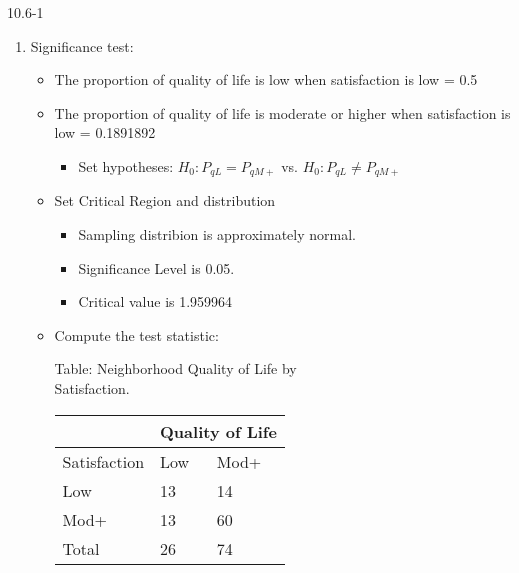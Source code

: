 \begin{exsol@solution}{10.6-1}

  \begin{enumerate}
	 \item Significance test:



\begin{itemize}

\item The proportion of quality of life is low when satisfaction is low = 0.5
\item The proportion of quality of life is moderate or higher when satisfaction is low = 0.1891892
  \begin{itemize}
  \item Set hypotheses: $H_0: P_{qL} = P_{qM+}$ vs. $H_0: P_{qL} \ne P_{qM+}$
  \end{itemize}

\item Set Critical Region and distribution

  \begin{itemize}
  \item Sampling distribion is approximately normal.
  \item Significance Level is 0.05.
  \item Critical value is 1.959964
  \end{itemize}

\item Compute the test statistic:

\begin{minipage}[ht]{6cm}

Table: Neighborhood Quality of Life by \\ Satisfaction.

      \begin{tabular}{@{} p{2.5cm} p{1cm} p{1cm} @{}} \hline %
     &  \multicolumn{2}{c}{ Quality of Life } \\ \hline
     Satisfaction   & Low & Mod+ \\ \hline
     Low           & 13 & 14 \\
     Mod+          & 13 & 60 \\ \hline
     Total         & 26 & 74 \\ \hline
   \end{tabular}


\end{minipage}
\end{itemize}
\end{enumerate}
\end{exsol@solution}
